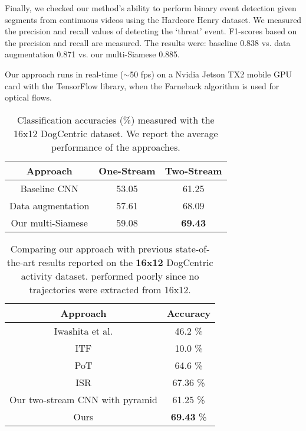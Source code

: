 \documentclass[letterpaper]{article} %
\begin{document}
Finally, we checked our method's ability to perform binary event detection given segments from continuous videos using the Hardcore Henry dataset. We measured the precision and recall values of detecting the `threat' event. F1-scores based on the precision and recall are measured. The results were: baseline 0.838 vs. data augmentation 0.871 vs. our multi-Siamese 0.885.


Our approach runs in real-time ($\sim$50 fps) on a Nvidia Jetson TX2 mobile GPU card with the TensorFlow library, when the Farneback algorithm is used for optical flows.



\begin{table}
	\caption{Classification accuracies (\%) measured with the 16x12 DogCentric dataset. We report the average performance of the approaches.}
	\label{table:dog}

	\center
	\setlength\extrarowheight{0.5pt}

		\begin{tabular}{c|c|c}
			\hline 	Approach & One-Stream & Two-Stream \tabularnewline
			\hline 	Baseline CNN &  53.05	& 	61.25   \tabularnewline
			        Data augmentation & 57.61		& 68.09  \tabularnewline
			        Our multi-Siamese & 59.08	& 	\textbf{69.43}	  \tabularnewline
			\hline
		\end{tabular}
\end{table}

\begin{table}
	\caption{Comparing our approach with previous state-of-the-art results reported on the \textbf{16x12} DogCentric activity dataset. \cite{wang13} performed poorly since no trajectories were extracted from 16x12.}
	\label{table:dog-comp}

	\center
	\setlength\extrarowheight{0.5pt}

		\begin{tabular}{c|c}
			\hline 	Approach & Accuracy \tabularnewline
			\hline 	
			        Iwashita et al.  \cite{dogcentric} & 46.2 \%	 \tabularnewline
			        ITF \cite{wang13} & 10.0 \% \tabularnewline
			        PoT \cite{ryoo15} & 64.6 \% \tabularnewline
			        ISR \cite{ryoo17privacy} & 67.36 \%	 \tabularnewline
			\hline
			        Our two-stream CNN with pyramid  & 61.25	\%  \tabularnewline
			        Ours    & \textbf{69.43} \%	  \tabularnewline
			\hline
		\end{tabular}

\end{table}
\end{document}
